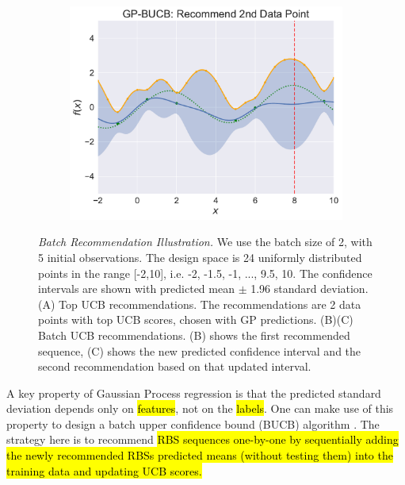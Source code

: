 \begin{figure}
\begin{subfigure}[b]{0.49\textwidth}
        \includegraphics[scale=0.4]{plots/Main_Paper/GP-BUCB_Recommend_2nd_Data_Point.pdf}
    \end{subfigure}
    \caption{\emph{Batch Recommendation Illustration.} We use the batch size of 2, with 5 initial observations. The design space is 24 uniformly distributed points in the range [-2,10], i.e. {-2, -1.5, -1, ..., 9.5, 10}.
    The confidence intervals are shown with predicted mean $\pm$ 1.96 standard deviation.
    (A) Top UCB recommendations. The recommendations are 2 data points with top UCB scores, chosen with GP predictions.
    (B)(C) Batch UCB recommendations. (B) shows the first recommended sequence, (C) shows the new predicted confidence interval and the second recommendation based on that updated interval.}
    \label{fig:batch rec}
\end{figure}


A key property of Gaussian Process regression is that the predicted standard deviation depends only on \hl{features}, not on the \hl{labels}.
One can make use of this property to design a batch upper confidence bound (BUCB) algorithm \cite{desautels2014parallelizing}.
The strategy here is to recommend \hl{RBS sequences one-by-one by sequentially adding the newly recommended RBSs predicted means (without testing them) into the training data and updating UCB scores.}\\

